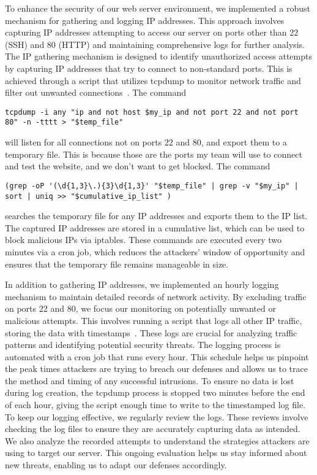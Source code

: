 To enhance the security of our web server environment, we implemented a robust mechanism for gathering and logging IP addresses. This approach involves capturing IP addresses attempting to access our server on ports other than 22 (SSH) and 80 (HTTP) and maintaining comprehensive logs for further analysis. The IP gathering mechanism is designed to identify unauthorized access attempts by capturing IP addresses that try to connect to non-standard ports. This is achieved through a script that utilizes tcpdump to monitor network traffic and filter out unwanted connections~\cite{TechTarget_Net}. The command  
\begin{verbatim}
tcpdump -i any "ip and not host $my_ip and not port 22 and not port 80" -n -tttt > "$temp_file"
\end{verbatim}
will listen for all connections not on ports 22 and 80, and export them to a temporary file. This is because those are the ports my team will use to connect and test the website, and we don't want to get blocked.  
The command 
\begin{verbatim}
(grep -oP '(\d{1,3}\.){3}\d{1,3}' "$temp_file" | grep -v "$my_ip" | sort | uniq >> "$cumulative_ip_list" )
\end{verbatim}
searches the temporary file for any IP addresses and exports them to the IP list.  
The captured IP addresses are stored in a cumulative list, which can be used to block malicious IPs via iptables. These commands are executed every two minutes via a cron job, which reduces the attackers' window of opportunity and ensures that the temporary file remains manageable in size.

In addition to gathering IP addresses, we implemented an hourly logging mechanism to maintain detailed records of network activity. By excluding traffic on ports 22 and 80, we focus our monitoring on potentially unwanted or malicious attempts.
This involves running a script that logs all other IP traffic, storing the data with timestamps~\cite{Schwartz_TCPDUMP}. These logs are crucial for analyzing traffic patterns and identifying potential security threats. 
The logging process is automated with a cron job that runs every hour. This schedule helps us pinpoint the peak times attackers are trying to breach our defenses and allows us to trace the method and timing of any successful intrusions.
To ensure no data is lost during log creation, the tcpdump process is stopped two minutes before the end of each hour, giving the script enough time to write to the timestamped log file.
To keep our logging effective, we regularly review the logs. These reviews involve checking the log files to ensure they are accurately capturing data as intended. We also analyze the recorded attempts to understand the strategies attackers are using to target our server. 
This ongoing evaluation helps us stay informed about new threats, enabling us to adapt our defenses accordingly.
